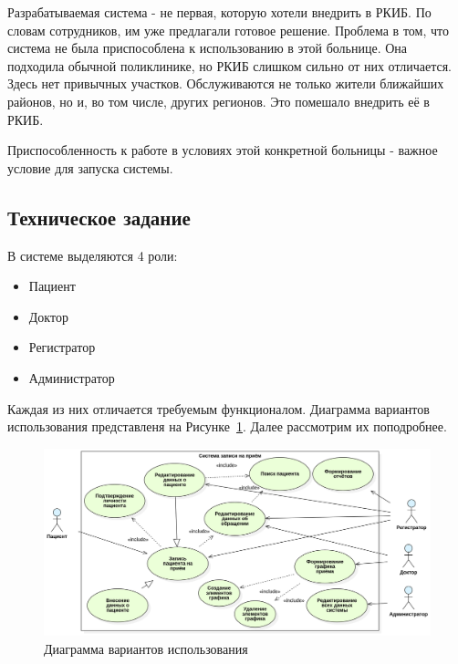\documentclass[a4paper,article]{article}
\begin{document}
        Разрабатываемая система - не первая, которую хотели внедрить в РКИБ. По словам сотрудников, им уже предлагали готовое решение. Проблема в том, что система не была приспособлена к использованию в этой больнице. Она подходила обычной поликлинике, но РКИБ слишком сильно от них отличается. Здесь нет привычных участков. Обслуживаются не только жители ближайших районов, но и, во том числе, других регионов. Это помешало внедрить её в РКИБ.

        Приспособленность к работе в условиях этой конкретной больницы - важное условие для запуска системы.

    \subsection{Техническое задание}\label{Техническое задание}

        В системе выделяются 4 роли:

        \begin{itemize}[nolistsep]
            \item Пациент
            \item Доктор
            \item Регистратор
            \item Администратор
        \end{itemize}

        Каждая из них отличается требуемым функционалом. Диаграмма вариантов использования представленя на Рисунке~\ref{fig:Диаграмма вариантов использования}. Далее рассмотрим их поподробнее.

        \begin{figure}[h]

            \centering

            \includegraphics[width=0.8\linewidth]{Диаграмма вариантов использования.png}

            \caption{\centering Диаграмма вариантов использования}

            \label{fig:Диаграмма вариантов использования}

        \end{figure}
\end{document}
